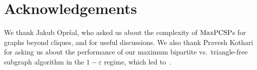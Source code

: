 \documentclass[a4paper,11pt, DIV=11]{scrartcl}
\renewcommand{\epsilon}{\varepsilon}
\DeclareMathOperator{\maxPCSP}{\textup{MaxPCSP}}
\theoremstyle{plain}
\theoremstyle{definition}
\begin{document}
\section*{Acknowledgements}

We thank Jakub Opr\v{s}al, who asked us about the complexity of $\maxPCSP$s for
graphs beyond cliques, and for useful discussions. We also thank Pravesh Kothari
for asking us about the performance of our maximum bipartite vs.~triangle-free
subgraph algorithm in the $1 - \epsilon$ regime, which led to~.

{


}
\end{document}
